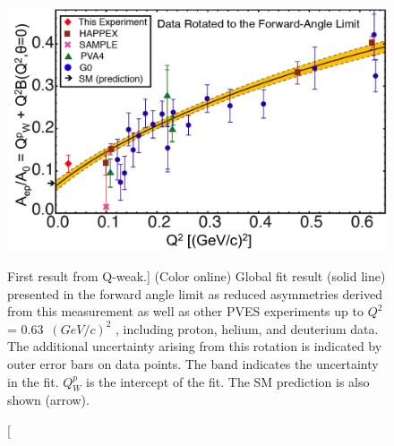 \begin{singlespace}
\begin{figure}[!h]
	\begin{center}
	\includegraphics[width=15.0cm]{figures/qweakResult25Percent}
	\end{center}
	\caption
	[First result from Q-weak.]
	{(Color online) Global fit result (solid line) presented in the forward angle limit as reduced asymmetries derived from this measurement as well as other PVES experiments up to $Q^{2}$ = 0.63~$(GeV/c)^{2}$ \cite{PhysRevC.69.065501, PhysRevLett.82.1096, PhysRevLett.96.022003, Aniol2006275, PhysRevLett.98.032301, PhysRevLett.108.102001, Spayde200479, PhysRevLett.92.102003, PhysRevLett.95.092001, PhysRevLett.104.012001, PhysRevLett.93.022002, PhysRevLett.94.152001, PhysRevLett.102.151803, PhysRevD.86.010001, PhysRevLett.109.203003, Wood21031997, PhysRevLett.111.141803}, including proton, helium, and deuterium data. The additional uncertainty arising from this rotation is indicated by outer error bars on data points. The band indicates the uncertainty in the fit. $Q^{p}_{W}$ is the intercept of the fit. The SM prediction \cite{PhysRevD.86.010001} is also shown (arrow).}
	\label{fig:qweakResult25Percent}
\end{figure}
\end{singlespace}


